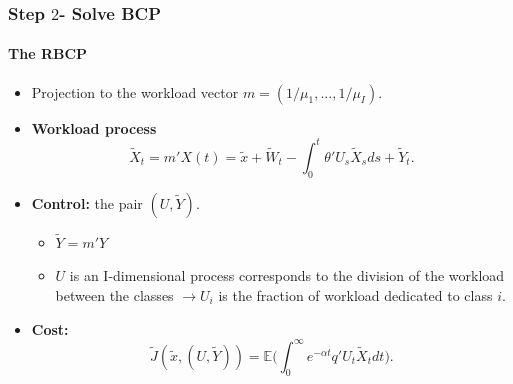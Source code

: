\documentclass{beamer}
\begin{document}
\begin{frame}
  \frametitle{Step $2$- Solve BCP}
  \framesubtitle{The RBCP}

  \vfill
  \begin{itemize}[<+->]
  \item Projection to the workload vector $m=(1/\mu_1,...,1/\mu_I)$. 
    \vfill
  \item {\bf Workload process} 
    \[
    \tilde {X}_t=m' X(t)=\tilde{x}+\tilde{W}_t-\int_0^t \theta' U_s \tilde{X}_s ds+\tilde{Y}_t.
    \]

    \vfill
  \item {\bf Control:} the pair $(U,\tilde Y)$.
    \begin{itemize}[<+->]%
    \item $\tilde Y=m' Y$ 
    \item $U$ is an I-dimensional process corresponds to the division of the workload between the classes $\rightarrow U_i$ is the fraction of workload dedicated to class $i$.
    \end{itemize}
    \vfill
  \item {\bf Cost:}
    \[
    \tilde{J}(\tilde{x},(U,\tilde{Y}))
    =\mathbb{E} \Big(\int_{0}^{\infty} e^{-\alpha t} q'U_t\tilde{X}_{t}dt\Big).
    \]
  \end{itemize}
  \vfill
  
\end{frame}
\end{document}
